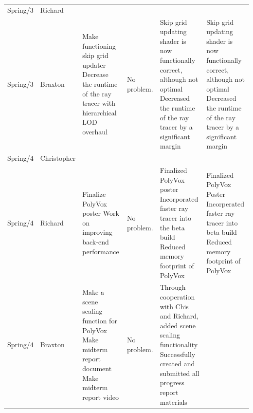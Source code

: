 \documentclass[onecolumn, draftclsnofoot,10pt, compsoc]{IEEEtran}
\begin{document}
\begin{tiny}
\begin{longtable}{ | p{} | p{} | p{} | p{} | p{} | p{} | }
&

\\ \hline
Spring/3 & Richard & 

&

&

&

\\ \hline
Spring/3 & Braxton & 

Make functioning skip grid updater \newline
Decrease the runtime of the ray tracer with hierarchical LOD overhaul 

&

No problem.

&

Skip grid updating shader is now functionally correct, although not optimal \newline
Decreased the runtime of the ray tracer by a significant margin 

&

Skip grid updating shader is now functionally correct, although not optimal \newline
Decreased the runtime of the ray tracer by a significant margin 

\\ \hline
Spring/4 & Christopher & 

&

&

&

\\ \hline
Spring/4 & Richard & 
Finalize PolyVox poster \newline
Work on improving back-end performance 
&
No problem.
&
Finalized PolyVox poster \newline
Incorporated faster ray tracer into the beta build \newline
Reduced memory footprint of PolyVox 
&
Finalized PolyVox Poster \newline
Incorperated faster ray tracer into beta build \newline
Reduced memory footprint of PolyVox 
\\ \hline
Spring/4 & Braxton & 

Make a scene scaling function for PolyVox \newline
Make midterm report document \newline
Make midterm report video 

&

No problem.

&

Through cooperation with Chis and Richard, added scene scaling functionality \newline
Successfully created and submitted all progress report materials 


\end{longtable}
\end{tiny}
\end{document}
